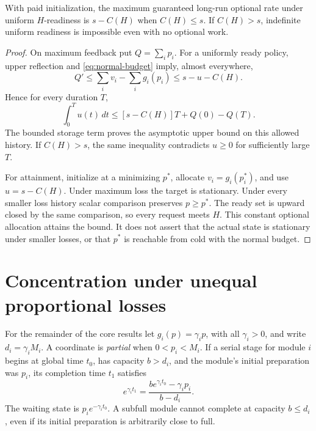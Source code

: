 \begin{theorem}
\label{thm:maintenance}
With paid initialization, the maximum guaranteed long-run optional rate under
uniform \(H\)-readiness is \(s-C(H)\) when \(C(H)\leq s\).
If \(C(H)>s\), indefinite uniform readiness is impossible even with no
optional work.
\end{theorem}
\begin{proof}
On maximum feedback put \(Q=\sum_i p_i\). For a uniformly ready policy,
upper reflection and \eqref{eq:normal-budget} imply, almost everywhere,
\[
 Q'\leq \sum_i v_i-\sum_i g_i(p_i)\leq s-u-C(H).
\]
Hence for every duration \(T\),
\begin{equation}
 \int_0^T u(t)\,dt
 \leq [s-C(H)]T+Q(0)-Q(T).
 \label{eq:storage-bound}
\end{equation}
The bounded storage term proves the asymptotic upper bound on this allowed
history. If \(C(H)>s\), the same inequality contradicts \(u\geq0\) for
sufficiently large \(T\).

For attainment, initialize at a minimizing \(p^*\), allocate
\(v_i=g_i(p_i^*)\), and use \(u=s-C(H)\). Under maximum loss the target is
stationary. Under every smaller loss history scalar comparison preserves
\(p\geq p^*\). The ready set is upward closed by the same comparison, so
every request meets \(H\). This constant optional allocation attains the
bound. It does not assert that the actual state is stationary under smaller
losses, or that \(p^*\) is reachable from cold with the normal budget.
\end{proof}

\section{Concentration under unequal proportional losses}
\label{sec:concentration}

For the remainder of the core results let \(g_i(p)=\gamma_i p\), with all
\(\gamma_i>0\), and write \(d_i=\gamma_iM_i\).
A coordinate is \emph{partial} when \(0<p_i<M_i\).
If a serial stage for module \(i\) begins at global time \(t_0\), has capacity
\(b>d_i\), and the module's initial preparation was \(p_i\), its completion
time \(t_1\) satisfies
\begin{equation}
 e^{\gamma_i t_1}
 =\frac{b e^{\gamma_i t_0}-\gamma_i p_i}{b-d_i}.
 \label{eq:proportional-stage}
\end{equation}
The waiting state is \(p_i e^{-\gamma_i t_0}\). A subfull module cannot
complete at capacity \(b\leq d_i\), even if its initial preparation is
arbitrarily close to full.

